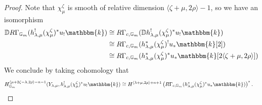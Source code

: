\documentclass[10pt,a4paper]{amsart}
\newcommand{\DD}{\mathbb{D}}
\newcommand{\G}{\mathbb{G}}
\renewcommand{\k}{\mathbbm{k}}
\begin{document}
\begin{proof}
         Note that $\chi_{\mu}^{\zeta}$ is smooth of relative dimension $\langle \zeta +\mu , 2\rho \rangle - 1$, so we have an isomorphism
         \begin{align*}
            \DD R\Gamma_{\G_m} (h_{\lambda, \mu}^! (\chi_{\mu}^{\zeta})^* u_! \k) &\cong R\Gamma_{c, \G_m} (\DD h_{\lambda, \mu}^! (\chi_{\mu}^{\zeta})^* u_! \k) \\
            &\cong R\Gamma_{c, \G_m} (h_{\lambda, \mu}^* (\chi_{\mu}^{\zeta})^! u_* \k [2]) \\
            &\cong R\Gamma_{c, \G_m} (h_{\lambda, \mu}^* (\chi_{\mu}^{\zeta})^* u_* \k [2\langle \zeta + \mu,  2\rho \rangle])
         \end{align*}
         We conclude by taking cohomology that 
         \begin{align*}
            H_{\G_m}^{\langle \mu + 2\zeta - \lambda, 2\rho \rangle - n - 1} (Y_{\lambda, \mu}, h_{\lambda, \mu}^! (\chi_{\mu}^{\zeta})^* u_! \k) &\cong H^{\langle \lambda + \mu, 2\rho \rangle + n + 1} \left( R\Gamma_{c, \G_m} ( h_{\lambda, \mu}^* (\chi_{\mu}^{\zeta})^* u_* \k) \right)^*.
         \end{align*}
    \end{proof}
\end{document}
